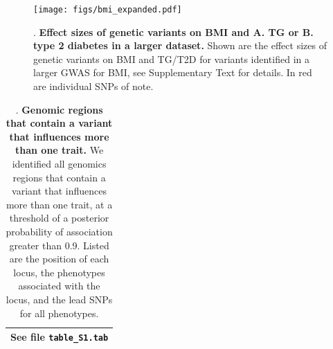 \documentclass[11pt,titlepage]{article}
\begin{document}
\begin{figure}
\begin{center}
\texttt{[image: figs/bmi\_expanded.pdf]}
\caption{. \textbf{Effect sizes of genetic variants on BMI and A. TG or B. type 2 diabetes in a larger dataset.} Shown are the effect sizes of genetic variants on BMI and TG/T2D for variants identified in a larger GWAS for BMI, see Supplementary Text for details. In red are individual SNPs of note.}\label{f_bmi_expanded}
\end{center}
\end{figure}

\clearpage
\begin{center}
\begin{table}
\tiny{
    \begin{tabular}{| c|}
       \hline
 	See file \texttt{table\_S1.tab} \\
       \hline
        
    \end{tabular}
    }
      \caption{. \textbf{Genomic regions that contain a variant that influences more than one trait.} We identified all genomics regions that contain a variant that influences more than one trait, at a threshold of a posterior probability of association greater than 0.9. Listed are the position of each locus, the phenotypes associated with the locus, and the lead SNPs for all phenotypes.} 
\end{table}
\end{center}

\clearpage
\end{document}

